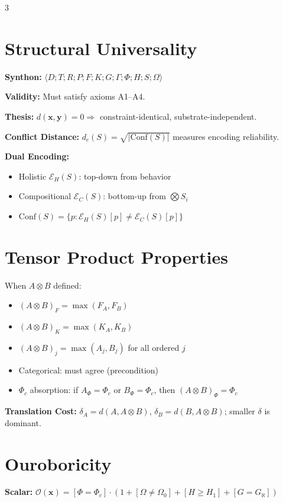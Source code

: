 \documentclass[8pt,a4paper,landscape]{article}
\begin{document}
\begin{multicols}{3}
\section*{Structural Universality}
\footnotesize
\textbf{Synthon:} $\langle D;T;R;P;F;K;G;\Gamma;\Phi;H;S;\Omega\rangle$

\textbf{Validity:} Must satisfy axioms A1–A4.

\textbf{Thesis:} $d(\mathbf{x},\mathbf{y})=0 \Rightarrow$ constraint-identical, substrate-independent.

\textbf{Conflict Distance:} $d_c(S)=\sqrt{|\text{Conf}(S)|}$ measures encoding reliability.

\textbf{Dual Encoding:}
\begin{itemize}[leftmargin=*,nosep,topsep=4pt,itemsep=2pt]
\item Holistic $\mathcal{E}_H(S)$: top-down from behavior
\item Compositional $\mathcal{E}_C(S)$: bottom-up from $\bigotimes S_i$
\item $\text{Conf}(S) = \{p : \mathcal{E}_H(S)[p] \neq \mathcal{E}_C(S)[p]\}$
\end{itemize}

\section*{Tensor Product Properties}
\footnotesize
When $A\otimes B$ defined:
\begin{itemize}[leftmargin=*,nosep,topsep=4pt,itemsep=2pt]
\item $(A\otimes B)_F = \max(F_A, F_B)$
\item $(A\otimes B)_K = \max(K_A, K_B)$
\item $(A\otimes B)_j = \max(A_j, B_j)$ for all ordered $j$
\item Categorical: must agree (precondition)
\item $\Phi_c$ absorption: if $A_\Phi=\Phi_c$ or $B_\Phi=\Phi_c$, then $(A\otimes B)_\Phi=\Phi_c$
\end{itemize}

\textbf{Translation Cost:} $\delta_A=d(A,A\otimes B)$, $\delta_B=d(B,A\otimes B)$; smaller $\delta$ is dominant.

\section*{Ouroboricity}
\footnotesize
\textbf{Scalar:} $\mathcal{O}(\mathbf{x})=[\Phi{=}\Phi_c]\cdot(1+[\Omega{\neq}\Omega_0]+[H{\ge}H_1]+[G{=}G_\aleph])$


\end{multicols}
\end{document}
